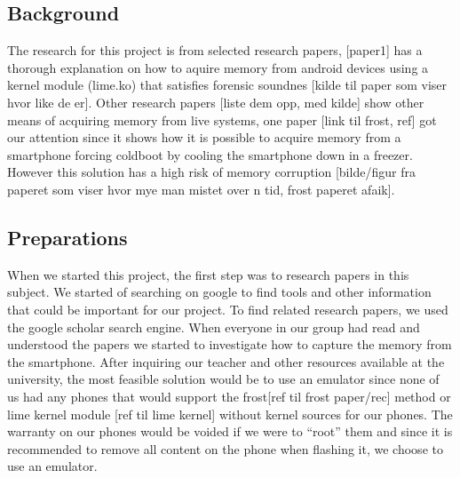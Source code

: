 \subsection{Background}
The research for this project is from selected research papers, [paper1] has a thorough explanation on how to aquire memory from android devices using a kernel module (lime.ko) that satisfies forensic soundnes [kilde til paper som viser hvor like de er]. Other research papers [liste dem opp, med kilde] show other means of acquiring memory from live systems, one paper [link til frost, ref] got our attention since it shows how it is possible to acquire memory from a smartphone forcing coldboot by cooling the smartphone down in a freezer. However this solution has a high risk of memory corruption [bilde/figur fra paperet som viser hvor mye man mistet over n tid, frost paperet afaik]. 

\subsection{Preparations}
When we started this project, the first step was to research papers in this subject. We started of searching on google to find tools and other information that could be important for our project. To find related research papers, we used the google scholar search engine. When everyone in our group had read and understood the papers we started to investigate how to capture the memory from the smartphone. After inquiring our teacher and other resources available at the university, the most feasible solution would be to use an emulator since none of us had any phones that would support the frost[ref til frost paper/rec] method or lime kernel module [ref til lime kernel] without kernel sources for our phones. The warranty on our phones would be voided if we were to “root” them and since it is recommended to remove all content on the phone when flashing it, we choose to use an emulator.


